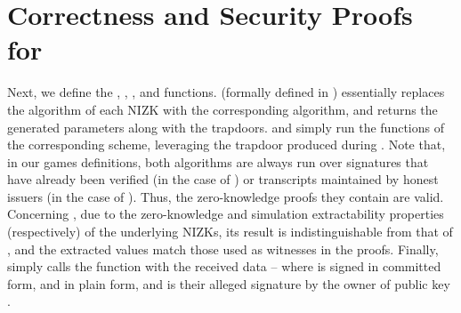 \section{Correctness and Security Proofs for \CUASGen}
\label{app:uas-proofs}

Next, we define the \SimSetup, \ExtractIssue, \ExtractSign, and \VerCred
functions. \SimSetup (formally defined in ) essentially
replaces the \Setup algorithm of each NIZK with the corresponding \NIZKSimSetup
algorithm, and returns the generated parameters along with the
trapdoors. \ExtractIssue and \ExtractSign simply run the \Extract functions
of the corresponding \NIZK scheme, leveraging the trapdoor produced during
\SimSetup. Note that, in our games definitions, both algorithms are always run
over signatures that have already been verified (in the case of \ExtractSign)
or transcripts maintained by honest issuers (in the case of \ExtractIssue).
Thus, the zero-knowledge proofs they contain are valid. Concerning \SimSetup,
due to the zero-knowledge and simulation extractability properties
(respectively) of the underlying NIZKs, its result is indistinguishable from
that of \Setup, and the extracted values match those used as witnesses in the
proofs. Finally, \VerCred simply calls the \SBCMVerify function with the
received data -- where \usk is signed in committed form, \cid and \attrs in
plain form, and \cred is their alleged signature by the owner of public key
\ipk.

